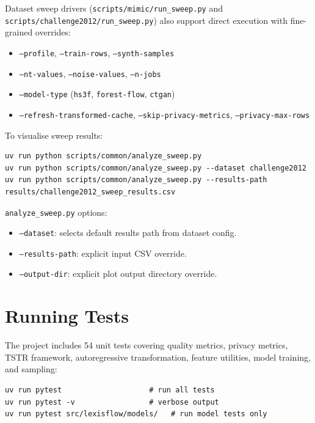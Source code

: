 Dataset sweep drivers (\texttt{scripts/mimic/run\_sweep.py} and
\texttt{scripts/challenge2012/run\_sweep.py}) also support direct execution with
fine-grained overrides:
\begin{itemize}\tightlist
    \item \texttt{--profile}, \texttt{--train-rows}, \texttt{--synth-samples}
    \item \texttt{--nt-values}, \texttt{--noise-values}, \texttt{--n-jobs}
    \item \texttt{--model-type} (\texttt{hs3f}, \texttt{forest-flow}, \texttt{ctgan})
    \item \texttt{--refresh-transformed-cache}, \texttt{--skip-privacy-metrics}, \texttt{--privacy-max-rows}
\end{itemize}

To visualise sweep results:

\begin{verbatim}
uv run python scripts/common/analyze_sweep.py
uv run python scripts/common/analyze_sweep.py --dataset challenge2012
uv run python scripts/common/analyze_sweep.py --results-path results/challenge2012_sweep_results.csv
\end{verbatim}

\texttt{analyze\_sweep.py} options:
\begin{itemize}\tightlist
    \item \texttt{--dataset}: selects default results path from dataset config.
    \item \texttt{--results-path}: explicit input CSV override.
    \item \texttt{--output-dir}: explicit plot output directory override.
\end{itemize}

\section{Running Tests}

The project includes 54 unit tests covering quality metrics, privacy metrics, TSTR framework, autoregressive transformation, feature utilities, model training, and sampling:

\begin{verbatim}
uv run pytest                    # run all tests
uv run pytest -v                 # verbose output
uv run pytest src/lexisflow/models/   # run model tests only
\end{verbatim}
